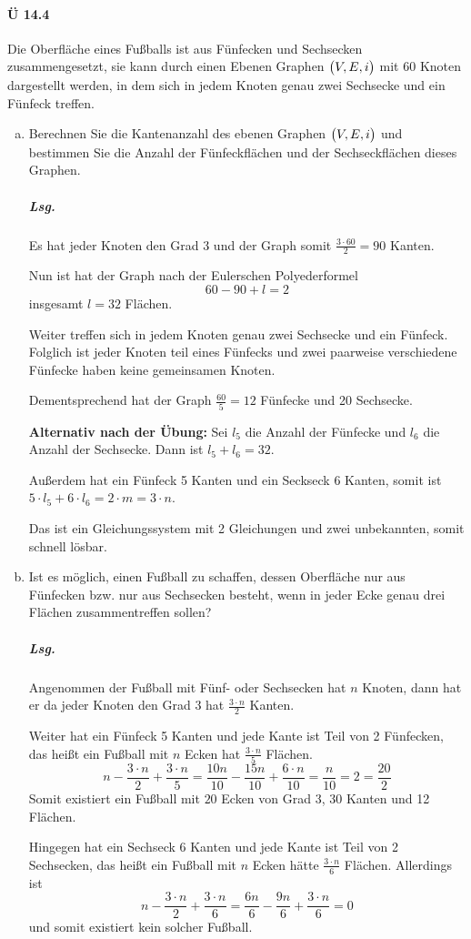 \documentclass{scrreprt}
\begin{document}
\paragraph{Ü 14.4} Die Oberfläche eines Fußballs ist aus Fünfecken und
Sechsecken zusammengesetzt, sie kann durch einen Ebenen Graphen
$\qty\big(V, E, i)$ mit 60 Knoten dargestellt werden, in dem sich in jedem Knoten
genau zwei Sechsecke und ein Fünfeck treffen.
\begin{enumerate}[(a)]
\item Berechnen Sie die Kantenanzahl des ebenen Graphen $\qty\big(V, E, i)$ und
  bestimmen Sie die Anzahl der Fünfeckflächen und der Sechseckflächen dieses
  Graphen.

  \subparagraph{Lsg.} Es hat jeder Knoten den Grad 3 und der Graph somit
  $\frac{3 \cdot 60}{2} = 90$ Kanten.

  Nun ist hat der Graph nach der Eulerschen Polyederformel
  \[
    60 - 90 + l = 2
  \]
  insgesamt $l = 32$ Flächen.

  Weiter treffen sich in jedem Knoten genau zwei Sechsecke und ein Fünfeck.
  Folglich ist jeder Knoten teil eines Fünfecks und zwei paarweise verschiedene
  Fünfecke haben keine gemeinsamen Knoten.

  Dementsprechend hat der Graph $\frac{60}{5} = 12$ Fünfecke und 20 Sechsecke.

  \textbf{Alternativ nach der Übung:} Sei $l_5$ die Anzahl der Fünfecke und
  $l_6$ die Anzahl der Sechsecke.
  Dann ist $l_5 + l_6 = 32$.

  Außerdem hat ein Fünfeck 5 Kanten und ein Seckseck 6 Kanten, somit ist
  $5 \cdot l_5 + 6 \cdot l_6 = 2 \cdot m = 3 \cdot n$.

  Das ist ein Gleichungssystem mit 2 Gleichungen und zwei unbekannten, somit
  schnell lösbar.

\item Ist es möglich, einen Fußball zu schaffen, dessen Oberfläche nur aus
  Fünfecken bzw. nur aus Sechsecken besteht, wenn in jeder Ecke genau drei
  Flächen zusammentreffen sollen?

  \subparagraph{Lsg.} Angenommen der Fußball mit Fünf- oder Sechsecken hat $n$
  Knoten, dann hat er da jeder Knoten den Grad $3$ hat $\frac{3 \cdot n}{2}$
  Kanten.

  Weiter hat ein Fünfeck 5 Kanten und jede Kante ist Teil von 2 Fünfecken,
  das heißt ein Fußball mit $n$ Ecken hat $\frac{3 \cdot n}{5}$ Flächen.
  \[
    n - \frac{3 \cdot n}{2} + \frac{3 \cdot n}{5} =
    \frac{10n}{10} - \frac{15n}{10} + \frac{6 \cdot n}{10}
    = \frac{n}{10} = 2 = \frac{20}{2}
  \]
  Somit existiert ein Fußball mit $20$ Ecken von Grad 3, 30 Kanten und 12
  Flächen.

  Hingegen hat ein Sechseck 6 Kanten und jede Kante ist Teil von 2 Sechsecken,
  das heißt ein Fußball mit $n$ Ecken hätte $\frac{3 \cdot n}{6}$ Flächen.
  Allerdings ist
  \[
    n - \frac{3 \cdot n}{2} + \frac{3 \cdot n}{6} =
    \frac{6n}{6} - \frac{9n}{6} + \frac{3\cdot n}{6}
    = 0
  \]
  und somit existiert kein solcher Fußball.
\end{enumerate}
\end{document}
